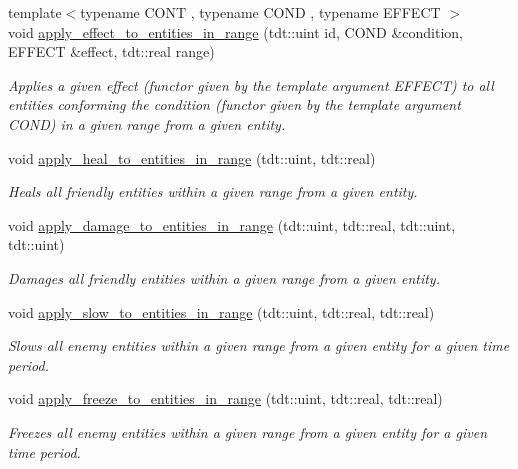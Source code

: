 \begin{DoxyCompactItemize}
{\footnotesize template$<$typename C\+O\+NT , typename C\+O\+ND , typename E\+F\+F\+E\+CT $>$ }\\void \hyperlink{class_combat_system_a7003f0a13c90284528508282c6ac81f9}{apply\+\_\+effect\+\_\+to\+\_\+entities\+\_\+in\+\_\+range} (tdt\+::uint id, C\+O\+ND \&condition, E\+F\+F\+E\+CT \&effect, tdt\+::real range)
\begin{DoxyCompactList}\small\item\em Applies a given effect (functor given by the template argument E\+F\+F\+E\+CT) to all entities conforming the condition (functor given by the template argument C\+O\+ND) in a given range from a given entity. \end{DoxyCompactList}\item 
void \hyperlink{class_combat_system_a1ea784797f890c7aebeff257624bbea6}{apply\+\_\+heal\+\_\+to\+\_\+entities\+\_\+in\+\_\+range} (tdt\+::uint, tdt\+::real)
\begin{DoxyCompactList}\small\item\em Heals all friendly entities within a given range from a given entity. \end{DoxyCompactList}\item 
void \hyperlink{class_combat_system_a31038240f549621d2ec192b0942e29c5}{apply\+\_\+damage\+\_\+to\+\_\+entities\+\_\+in\+\_\+range} (tdt\+::uint, tdt\+::real, tdt\+::uint, tdt\+::uint)
\begin{DoxyCompactList}\small\item\em Damages all friendly entities within a given range from a given entity. \end{DoxyCompactList}\item 
void \hyperlink{class_combat_system_ae64eaa3c5a01037a6b1ea9db3bb93747}{apply\+\_\+slow\+\_\+to\+\_\+entities\+\_\+in\+\_\+range} (tdt\+::uint, tdt\+::real, tdt\+::real)
\begin{DoxyCompactList}\small\item\em Slows all enemy entities within a given range from a given entity for a given time period. \end{DoxyCompactList}\item 
void \hyperlink{class_combat_system_a3cd665daca2c1c49ca0788d97f5d2c8f}{apply\+\_\+freeze\+\_\+to\+\_\+entities\+\_\+in\+\_\+range} (tdt\+::uint, tdt\+::real, tdt\+::real)
\begin{DoxyCompactList}\small\item\em Freezes all enemy entities within a given range from a given entity for a given time period. \end{DoxyCompactList}\item 

\end{DoxyCompactItemize}
